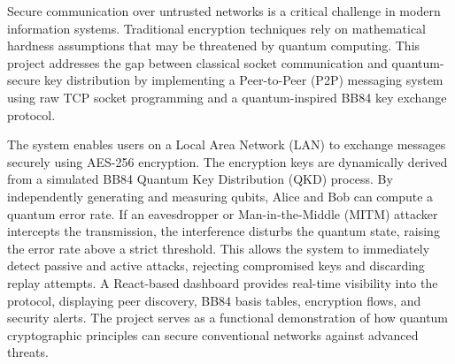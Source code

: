 \vspace{-1cm}

Secure communication over untrusted networks is a critical challenge in modern information systems. Traditional encryption techniques rely on mathematical hardness assumptions that may be threatened by quantum computing. This project addresses the gap between classical socket communication and quantum-secure key distribution by implementing a Peer-to-Peer (P2P) messaging system using raw TCP socket programming and a quantum-inspired BB84 key exchange protocol.

The system enables users on a Local Area Network (LAN) to exchange messages securely using AES-256 encryption. The encryption keys are dynamically derived from a simulated BB84 Quantum Key Distribution (QKD) process. By independently generating and measuring qubits, Alice and Bob can compute a quantum error rate. If an eavesdropper or Man-in-the-Middle (MITM) attacker intercepts the transmission, the interference disturbs the quantum state, raising the error rate above a strict threshold. This allows the system to immediately detect passive and active attacks, rejecting compromised keys and discarding replay attempts.
A React-based dashboard provides real-time visibility into the protocol, displaying peer discovery, BB84 basis tables, encryption flows, and security alerts. The project serves as a functional demonstration of how quantum cryptographic principles can secure conventional networks against advanced threats.
